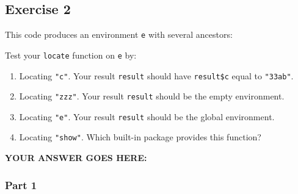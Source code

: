 \documentclass[
]{article}
\newenvironment{Shaded}{\begin{snugshade}}{\end{snugshade}}
\newcommand{\DataTypeTok}[1]{\textcolor[rgb]{0.13,0.29,0.53}{#1}}
\newcommand{\DecValTok}[1]{\textcolor[rgb]{0.00,0.00,0.81}{#1}}
\newcommand{\KeywordTok}[1]{\textcolor[rgb]{0.13,0.29,0.53}{\textbf{#1}}}
\newcommand{\NormalTok}[1]{#1}
\newcommand{\OperatorTok}[1]{\textcolor[rgb]{0.81,0.36,0.00}{\textbf{#1}}}
\newcommand{\StringTok}[1]{\textcolor[rgb]{0.31,0.60,0.02}{#1}}
\begin{document}
\hypertarget{exercise-2}{%
\subsection{Exercise 2}\label{exercise-2}}

This code produces an environment \texttt{e} with several ancestors:

\begin{Shaded}
\end{Shaded}

Test your \texttt{locate} function on \texttt{e} by:

\begin{enumerate}
\def\labelenumi{\arabic{enumi}.}
\item
  Locating \texttt{"c"}. Your result \texttt{result} should have
  \texttt{result\$c} equal to \texttt{"33ab"}.
\item
  Locating \texttt{"zzz"}. Your result \texttt{result} should be the
  empty environment.
\item
  Locating \texttt{"e"}. Your result \texttt{result} should be the
  global environment.
\item
  Locating \texttt{"show"}. Which built-in package provides this
  function?
\end{enumerate}

\textbf{YOUR ANSWER GOES HERE:}

\hypertarget{part-1}{%
\subsubsection{Part 1}\label{part-1}}

\begin{Shaded}
\end{Shaded}
\end{document}
